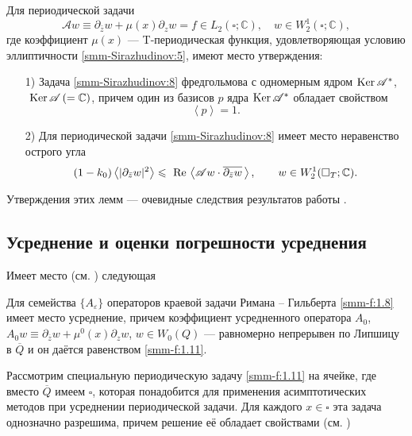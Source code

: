 	\begin{lemma}
		Для периодической задачи
		\begin{equation}\label{smm-Sirazhudinov:8}
			\mathscr{A}w\equiv \partial_{\bar{z}}w +\mu(x) \partial_{z}w =f\in L_2(\square;\mathbb{C}),\quad
			w\in W_2^1(\square;\mathbb{C}),
		\end{equation}
		где коэффициент $\mu(x)$  --- {T}-периодическая функция, удовлетворяющая условию эллиптичности \eqref{smm-Sirazhudinov:5}, имеют место  утверждения:
		\begin{enumerate}
			\item[1)] Задача  \eqref{smm-Sirazhudinov:8} фредгольмова с одномерным ядром $\text{Ker\,}\mathscr{A}^\ast$, $\text{ Ker\,}\mathscr{A}\,(=\mathbb{C})$,
			причем один из базисов $p$ ядра
			$\text{Ker\,}\mathscr{A}^\ast$ обладает свойством
			\begin{equation*}%
				\left< p\right>=1.
			\end{equation*}
			\item[2)] Для периодической задачи \eqref{smm-Sirazhudinov:8} имеет место неравенство острого угла
			\begin{equation}\label{smm-Sirazhudinov:9}
				(1-k_0)\left<|\partial_{\bar{z}}w|^2\right>\leqslant \text{ Re\,}
				\left<\mathscr{A} w\cdot \overline{\partial_{\bar{z}}w}\,\right>,\qquad
				w \in W_2^1(\square_T;\mathbb{C}).
			\end{equation}
		\end{enumerate}
	\end{lemma}
	Утверждения этих лемм --- очевидные следствия результатов работы \cite{smm-10}.


	\subsection{Усреднение и оценки погрешности усреднения}
	
	Имеет место (см. \cite{smm-10})  следующая
	
\begin{theorem}[Об усреднении]
 Для семейства $\{A_\varepsilon\}$ операторов краевой
		задачи Римана -- Гильберта \eqref{smm-f:1.8} имеет место усреднение, причем коэффициент
		усредненного оператора $A_0$, $A_0w\equiv\partial_{\overline{z}}w+\mu^0(x)\partial_zw$, $w\in W_0(Q)$ --- равномерно непрерывен  по Липшицу в $\overline{Q}$ и он даётся равенством \eqref{smm-f:1.11}.
\end{theorem}

Рассмотрим специальную периодическую задачу \eqref{smm-f:1.11} на ячейке, где вместо $\overline{Q}$ имеем $\square$,  которая понадобится для применения асимптотических методов при усреднении периодической задачи. Для каждого $x\in\square$ эта задача однозначно разрешима, причем решение её обладает свойствами (см. \cite{smm-10})

